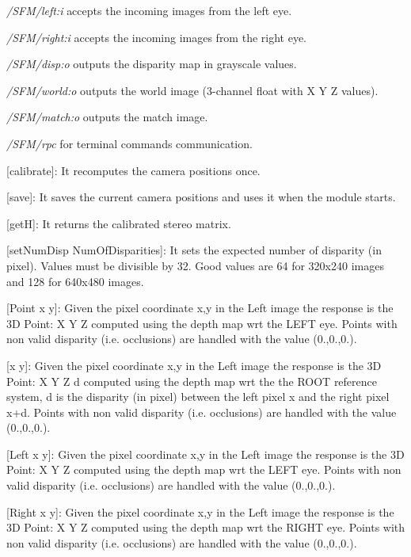 \begin{DoxyItemize}
\item {\itshape  /\+S\+F\+M/left\+:i } accepts the incoming images from the left eye.
\item {\itshape  /\+S\+F\+M/right\+:i } accepts the incoming images from the right eye.
\item {\itshape  /\+S\+F\+M/disp\+:o } outputs the disparity map in grayscale values.
\item {\itshape  /\+S\+F\+M/world\+:o} outputs the world image (3-\/channel float with X Y Z values).
\item {\itshape  /\+S\+F\+M/match\+:o} outputs the match image.
\item {\itshape  /\+S\+F\+M/rpc } for terminal commands communication.
\begin{DoxyItemize}
\item \mbox{[}calibrate\mbox{]}\+: It recomputes the camera positions once.
\item \mbox{[}save\mbox{]}\+: It saves the current camera positions and uses it when the module starts.
\item \mbox{[}get\+H\mbox{]}\+: It returns the calibrated stereo matrix.
\item \mbox{[}set\+Num\+Disp Num\+Of\+Disparities\mbox{]}\+: It sets the expected number of disparity (in pixel). Values must be divisible by 32. Good values are 64 for 320x240 images and 128 for 640x480 images.
\item \mbox{[}Point x y\mbox{]}\+: Given the pixel coordinate x,y in the Left image the response is the 3\+D Point\+: X Y Z computed using the depth map wrt the L\+E\+F\+T eye. Points with non valid disparity (i.\+e. occlusions) are handled with the value (0.,0.,0.).
\item \mbox{[}x y\mbox{]}\+: Given the pixel coordinate x,y in the Left image the response is the 3\+D Point\+: X Y Z d computed using the depth map wrt the the R\+O\+O\+T reference system, d is the disparity (in pixel) between the left pixel x and the right pixel x+d. Points with non valid disparity (i.\+e. occlusions) are handled with the value (0.,0.,0.).
\item \mbox{[}Left x y\mbox{]}\+: Given the pixel coordinate x,y in the Left image the response is the 3\+D Point\+: X Y Z computed using the depth map wrt the L\+E\+F\+T eye. Points with non valid disparity (i.\+e. occlusions) are handled with the value (0.,0.,0.).
\item \mbox{[}Right x y\mbox{]}\+: Given the pixel coordinate x,y in the Left image the response is the 3\+D Point\+: X Y Z computed using the depth map wrt the R\+I\+G\+H\+T eye. Points with non valid disparity (i.\+e. occlusions) are handled with the value (0.,0.,0.).

\end{DoxyItemize}
\end{DoxyItemize}
